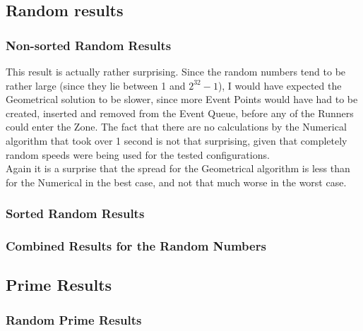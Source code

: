 \subsection{Random results}
\label{random_results}
\subsubsection{Non-sorted Random Results}


This result is actually rather surprising. Since the random numbers tend to be rather large (since they lie between 1 and $2^{32} - 1$), I would have expected the Geometrical solution to be slower, since more Event Points would have had to be created, inserted and removed from the Event Queue, before any of the Runners could enter the Zone. The fact that there are no calculations by the Numerical algorithm that took over 1 second is not that surprising, given that completely random speeds were being used for the tested configurations.\\



Again it is a surprise that the spread for the Geometrical algorithm is less than for the Numerical in the best case, and not that much worse in the worst case.

\subsubsection{Sorted Random Results}


\subsubsection{Combined Results for the Random Numbers}





\subsection{Prime Results}
\label{prime_results}

\subsubsection{Random Prime Results}
\label{random_prime_results}



